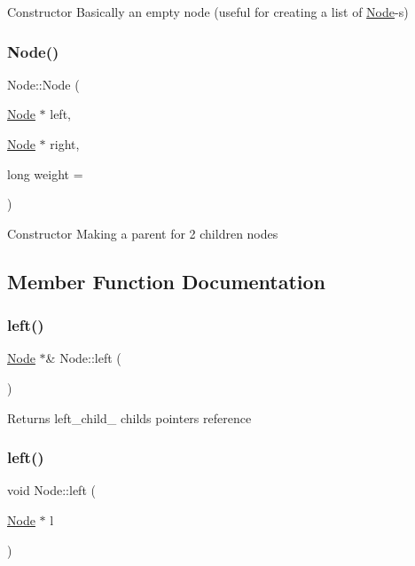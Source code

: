 Constructor Basically an empty node (useful for creating a list of \textquotesingle{}\hyperlink{class_node}{Node}\textquotesingle{}-\/s) \mbox{\label{class_node_a0c8bfbf358813f67b2ef802fa75c6b17}} 
\subsubsection{\texorpdfstring{Node()}{Node()}\hspace{0.1cm}{\footnotesize\ttfamily [2/2]}}
{\footnotesize\ttfamily Node\+::\+Node (\begin{DoxyParamCaption}\item[{\hyperlink{class_node}{Node} $\ast$}]{left,  }\item[{\hyperlink{class_node}{Node} $\ast$}]{right,  }\item[{long}]{weight = {} }\end{DoxyParamCaption})}

Constructor Making a parent for 2 children nodes 

\subsection{Member Function Documentation}
\mbox{\label{class_node_af9438bd5c1df91946e72ee3f7f133a40}} 
\subsubsection{\texorpdfstring{left()}{left()}\hspace{0.1cm}{\footnotesize\ttfamily [1/2]}}
{\footnotesize\ttfamily \hyperlink{class_node}{Node} $\ast$\& Node\+::left (\begin{DoxyParamCaption}{ }\end{DoxyParamCaption})}

Returns left\+\_\+child\+\_\+ child\textquotesingle{}s pointer\textquotesingle{}s reference \mbox{\label{class_node_afde9440840ad4576dd050ea734d02213}} 
\subsubsection{\texorpdfstring{left()}{left()}\hspace{0.1cm}{\footnotesize\ttfamily [2/2]}}
{\footnotesize\ttfamily void Node\+::left (\begin{DoxyParamCaption}\item[{\hyperlink{class_node}{Node} $\ast$}]{l }\end{DoxyParamCaption})}

